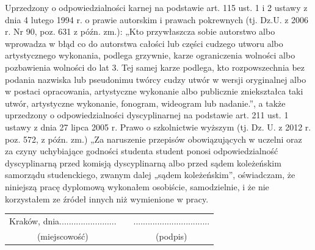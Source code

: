 \documentclass{article}
\begin{document}


    \newpage
    {
        \Large
        \justifying
        Uprzedzony o odpowiedzialności karnej na podstawie art. 115 ust. 1 i 2 ustawy z dnia 4 lutego
        1994 r. o prawie autorskim i prawach pokrewnych (tj. Dz.U. z 2006 r. Nr 90, poz. 631 z późn.
        zm.): „Kto przywłaszcza sobie autorstwo albo wprowadza w błąd co do autorstwa całości lub
        części cudzego utworu albo artystycznego wykonania, podlega grzywnie, karze ograniczenia
        wolności albo pozbawienia wolności do lat 3. Tej samej karze podlega, kto rozpowszechnia bez
        podania nazwiska lub pseudonimu twórcy cudzy utwór w wersji oryginalnej albo w postaci
        opracowania, artystyczne wykonanie albo publicznie zniekształca taki utwór, artystyczne
        wykonanie, fonogram, wideogram lub nadanie.”, a także uprzedzony o odpowiedzialności
        dyscyplinarnej na podstawie art. 211 ust. 1 ustawy z dnia 27 lipca 2005 r. Prawo o szkolnictwie
        wyższym (tj. Dz. U. z 2012 r. poz. 572, z późn. zm.) „Za naruszenie przepisów obowiązujących
        w uczelni oraz za czyny uchybiające godności studenta student ponosi odpowiedzialność
        dyscyplinarną przed komisją dyscyplinarną albo przed sądem koleżeńskim samorządu
        studenckiego, zwanym dalej „sądem koleżeńskim”, oświadczam, że niniejszą pracę
        dyplomową wykonałem osobiście, samodzielnie, i że nie korzystałem ze źródeł innych niż
        wymienione w pracy.
    }

    \vfill

    \begin{center}
        {
            \Large
            \setlength{\tabcolsep}{2em}
            \begin{tabulary}{0.75\textwidth}{ c c c }
                Kraków, dnia........................ && ................................\\
                (miejscowość)& & (podpis)\\
            \end{tabulary}
        }
    \end{center}
    
    \newpage
    \begin{center}
        {
            \Large
            \tableofcontents
        }
    \end{center}
    \newpage
    
\end{document}
